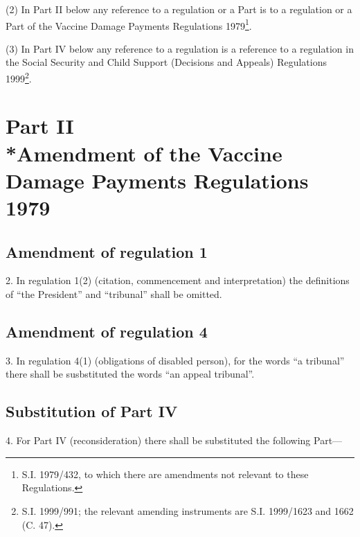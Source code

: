 \documentclass[12pt,a4paper]{article}
\begin{document}
(2) In Part II below any reference to a regulation or a Part is to a regulation or a Part of the Vaccine Damage Payments Regulations 1979\footnote{\frenchspacing S.I. 1979/432, to which there are amendments not relevant to these Regulations.}.

(3) In Part IV below any reference to a regulation is a reference to a regulation in the Social Security and Child Support (Decisions and Appeals) Regulations 1999\footnote{\frenchspacing S.I. 1999/991; the relevant amending instruments are S.I. 1999/1623 and 1662 (C. 47).}.

\section[Part II --- Amendment of the Vaccine Damage Payments Regulations 1979]{\sloppy Part II\\*Amendment of the Vaccine Damage Payments Regulations 1979}

\renewcommand\parthead{--- Part II}

\subsection[2. Amendment of regulation 1]{Amendment of regulation 1}

2.  In regulation 1(2) (citation, commencement and interpretation) the definitions of “the President” and “tribunal” shall be omitted.

\subsection[3. Amendment of regulation 4]{Amendment of regulation 4}

3.  In regulation 4(1) (obligations of disabled person), for the words “a tribunal” there shall be susbstituted the words “an appeal tribunal”.

\subsection[4. Substitution of Part IV]{Substitution of Part IV}

4.  For Part IV (reconsideration) there shall be substituted the following Part—
\end{document}
